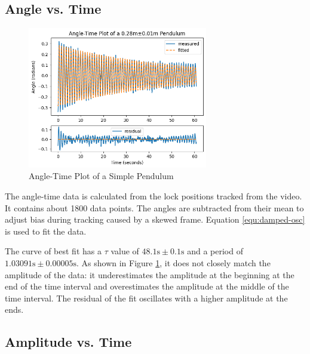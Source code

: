 \documentclass[12pt]{article}
\begin{document}
\subsection{Angle vs. Time} \label{section:angle-time}

\begin{figure}[!ht]
\begin{center}
\includegraphics[width=0.7\textwidth]{angle-time.png}
\end{center}
\caption{Angle-Time Plot of a Simple Pendulum}
\label{fig:angle-time}
\end{figure}

The angle-time data is calculated from the lock positions tracked from the video. It contains about 1800 data points. The angles are subtracted from their mean to adjust bias during tracking caused by a skewed frame. Equation \ref{equ:damped-osc} is used to fit the data.

The curve of best fit has a $\tau$ value of $48.1\mathrm{s}\pm0.1\mathrm{s}$ and a period of $1.03091\mathrm{s}\pm0.00005\mathrm{s}$. As shown in Figure \ref{fig:angle-time}, it does not closely match the amplitude of the data: it underestimates the amplitude at the beginning at the end of the time interval and overestimates the amplitude at the middle of the time interval. The residual of the fit oscillates with a higher amplitude at the ends.


\subsection{Amplitude vs. Time} \label{section:amplitude-time}
\end{document}
